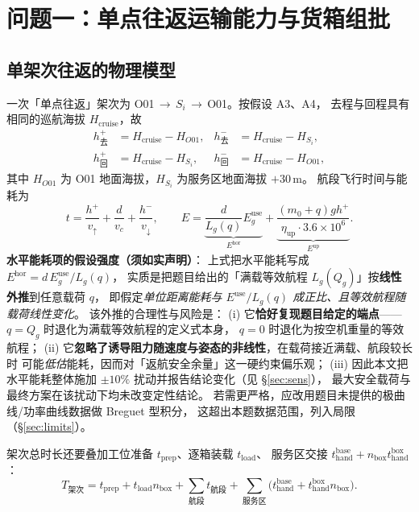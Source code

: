 \documentclass[12pt,a4paper,fontset=windows]{ctexart}
\begin{document}
\section{问题一：单点往返运输能力与货箱组批}
\subsection{单架次往返的物理模型}
一次「单点往返」架次为 O01\,$\to$\,$S_i$\,$\to$\,O01。按假设 A3、A4，
去程与回程具有相同的巡航海拔 $H_{\mathrm{cruise}}$，故
\begin{align}
h^{+}_{\text{去}}&=H_{\mathrm{cruise}}-H_{O01}, & h^{-}_{\text{去}}&=H_{\mathrm{cruise}}-H_{S_i},\\
h^{+}_{\text{回}}&=H_{\mathrm{cruise}}-H_{S_i}, & h^{-}_{\text{回}}&=H_{\mathrm{cruise}}-H_{O01},
\end{align}
其中 $H_{O01}$ 为 O01 地面海拔，$H_{S_i}$ 为服务区地面海拔 $+30$\,m。
航段飞行时间与能耗为
\begin{equation}
t=\frac{h^{+}}{v_{\uparrow}}+\frac{d}{v_c}+\frac{h^{-}}{v_{\downarrow}},\qquad
E=\underbrace{\frac{d}{L_g(q)}E_g^{\mathrm{use}}}_{E^{\mathrm{hor}}}
+\underbrace{\frac{(m_0+q)gh^{+}}{\eta_{\mathrm{up}}\cdot3.6\times10^{6}}}_{E^{\mathrm{up}}}.
\end{equation}
\noindent\textbf{水平能耗项的假设强度（须如实声明）}：
上式把水平能耗写成 $E^{\mathrm{hor}}=d\,E_g^{\mathrm{use}}/L_g(q)$，
实质是把题目给出的「满载等效航程 $L_g(Q_g)$」按\textbf{线性外推}到任意载荷 $q$，
即假定\emph{单位距离能耗与 $E^{\mathrm{use}}/L_g(q)$ 成正比、且等效航程随载荷线性变化}。
该外推的合理性与风险是：
(i) 它\textbf{恰好复现题目给定的端点}——$q=Q_g$ 时退化为满载等效航程的定义式本身，
$q=0$ 时退化为按空机重量的等效航程；
(ii) 它\textbf{忽略了诱导阻力随速度与姿态的非线性}，在载荷接近满载、航段较长时
可能\emph{低估}能耗，因而对「返航安全余量」这一硬约束偏乐观；
(iii) 因此本文把水平能耗整体施加 $\pm10\%$ 扰动并报告结论变化（见 \S\ref{sec:sens}），
最大安全载荷与最终方案在该扰动下均未改变定性结论。
若需更严格，应改用题目未提供的极曲线/功率曲线数据做 Breguet 型积分，
这超出本题数据范围，列入局限（\S\ref{sec:limits}）。

架次总时长还要叠加工位准备 $t_{\mathrm{prep}}$、逐箱装载 $t_{\mathrm{load}}$、
服务区交接 $t_{\mathrm{hand}}^{\mathrm{base}}+n_{\mathrm{box}}t_{\mathrm{hand}}^{\mathrm{box}}$：
\begin{equation}
T_{\text{架次}}=t_{\mathrm{prep}}+t_{\mathrm{load}}n_{\mathrm{box}}
+\sum_{\text{航段}}t_{\text{航段}}+\sum_{\text{服务区}}\big(t^{\mathrm{base}}_{\mathrm{hand}}+t^{\mathrm{box}}_{\mathrm{hand}}n_{\mathrm{box}}\big).
\end{equation}
\end{document}
